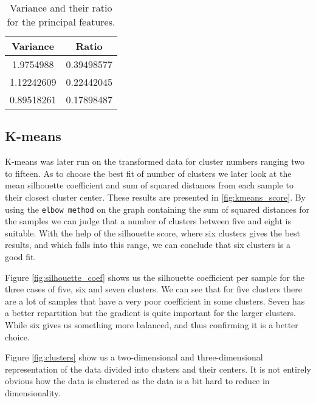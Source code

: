 \begin{table}
	\begin{center}
		\begin{tabular}{cc}
			\hline
			Variance & Ratio \\ \hline
			1.9754988 & 0.39498577 \\
			1.12242609 & 0.22442045 \\
			0.89518261 & 0.17898487 \\
			\hline
		\end{tabular}
		\caption{Variance and their ratio for the principal features.}
		\label{tab:pca_variance}
	\end{center}
\end{table}


\subsection{K-means}

K-means was later run on the transformed data for cluster numbers ranging two to fifteen. As to choose the best fit of number of clusters we later look at the mean silhouette coefficient and sum of squared distances from each sample to their closest cluster center. These results are presented in \ref{fig:kmeans_score}. By using the \texttt{elbow method} on the graph containing the sum of squared distances for the samples we can judge that a number of clusters between five and eight is suitable. With the help of the silhouette score, where six clusters gives the best results, and which falls into this range, we can conclude that six clusters is a good fit.

Figure \ref{fig:silhouette_coef} shows us the silhouette coefficient per sample for the three cases of five, six and seven clusters. We can see that for five clusters there are a lot of samples that have a very poor coefficient in some clusters. Seven has a better repartition but the gradient is quite important for the larger clusters. While six gives us something more balanced, and thus confirming it is a better choice.

Figure \ref{fig:clusters} show us a two-dimensional and three-dimensional representation of the data divided into clusters and their centers. It is not entirely obvious how the data is clustered as the data is a bit hard to reduce in dimensionality.

